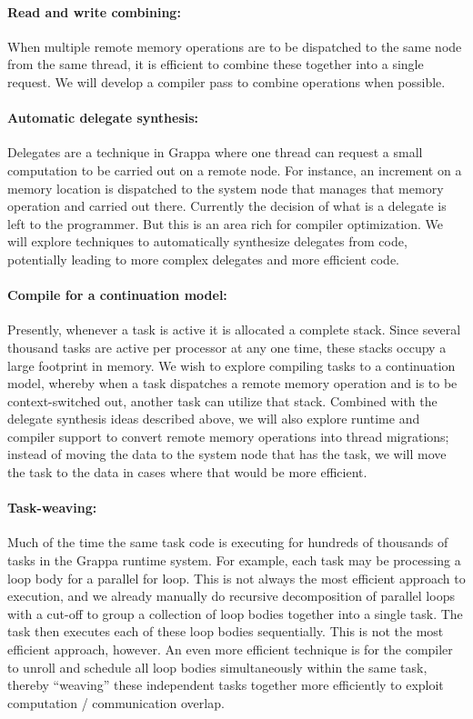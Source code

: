 \paragraph{Read and write combining: } When multiple remote memory operations are to be dispatched to the same node from the same thread, it is efficient to combine these together into a single request.  We will develop a compiler pass to combine operations when possible.

\paragraph{Automatic delegate synthesis: } Delegates are a technique in Grappa where one thread can request a small computation to be carried out on a remote node.  For instance, an increment on a memory location is dispatched to the system node that manages that memory operation and carried out there.  Currently the decision of what is a delegate is left to the programmer.  But this is an area rich for compiler optimization.  We will explore techniques to automatically synthesize delegates from code, potentially leading to more complex delegates and more efficient code.

\paragraph{Compile for a continuation model: } Presently, whenever a task is active it is allocated a complete stack.  Since several thousand tasks are active per processor at any one time, these stacks occupy a large footprint in memory.  We wish to explore compiling tasks to a continuation model, whereby when a task dispatches a remote memory operation and is to be context-switched out, another task can utilize that stack.  Combined with the delegate synthesis ideas described above, we will also explore runtime and compiler support to convert remote memory operations into thread migrations; instead of moving the data to the system node that has the task, we will move the task to the data in cases where that would be more efficient.

\paragraph{Task-weaving: } Much of the time the same task code is executing for hundreds of thousands of tasks in the Grappa runtime system.  For example, each task may be processing a loop body for a parallel for loop.  This is not always the most efficient approach to execution, and we already manually do recursive decomposition of parallel loops with a cut-off to group a collection of loop bodies together into a single task.  The task then executes each of these loop bodies sequentially.  This is not the most efficient approach, however.  An even more efficient technique is for the compiler to unroll and schedule all loop bodies simultaneously within the same task, thereby ``weaving'' these independent tasks together more efficiently to exploit computation / communication overlap.

